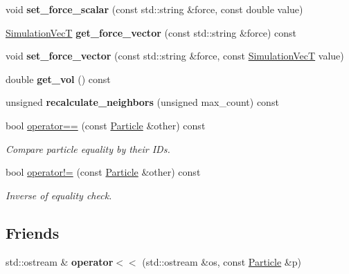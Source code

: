 \begin{DoxyCompactItemize}
void {\bfseries set\+\_\+force\+\_\+scalar} (const std\+::string \&force, const double value)
\item 
\mbox{\label{classwash_1_1Particle_a9c6ec5d5a7407897ecca00549bd05c01}} 
\mbox{\hyperlink{classwash_1_1Vec}{Simulation\+VecT}} {\bfseries get\+\_\+force\+\_\+vector} (const std\+::string \&force) const
\item 
\mbox{\label{classwash_1_1Particle_a6960cdd169d1829a52e49cf835a8bfeb}} 
void {\bfseries set\+\_\+force\+\_\+vector} (const std\+::string \&force, const \mbox{\hyperlink{classwash_1_1Vec}{Simulation\+VecT}} value)
\item 
\mbox{\label{classwash_1_1Particle_ab16021a2c003de07dc0a418ffc3d5eb7}} 
double {\bfseries get\+\_\+vol} () const
\item 
\mbox{\label{classwash_1_1Particle_a570fc3286ab83d081950a5fb3d548d92}} 
unsigned {\bfseries recalculate\+\_\+neighbors} (unsigned max\+\_\+count) const
\item 
bool \mbox{\hyperlink{classwash_1_1Particle_a32369e6edba4277ebc71917a37c2503d}{operator==}} (const \mbox{\hyperlink{classwash_1_1Particle}{Particle}} \&other) const
\begin{DoxyCompactList}\small\item\em Compare particle equality by their I\+Ds. \end{DoxyCompactList}\item 
bool \mbox{\hyperlink{classwash_1_1Particle_a32f1334a8a0b273a57355956d7e9fe63}{operator!=}} (const \mbox{\hyperlink{classwash_1_1Particle}{Particle}} \&other) const
\begin{DoxyCompactList}\small\item\em Inverse of equality check. \end{DoxyCompactList}\end{DoxyCompactItemize}
\subsection*{Friends}
\begin{DoxyCompactItemize}
\item 
\mbox{\label{classwash_1_1Particle_ad7d60c63b6d14d1d0d4fe42d4e9dc8bc}} 
std\+::ostream \& {\bfseries operator$<$$<$} (std\+::ostream \&os, const \mbox{\hyperlink{classwash_1_1Particle}{Particle}} \&p)
\end{DoxyCompactItemize}


